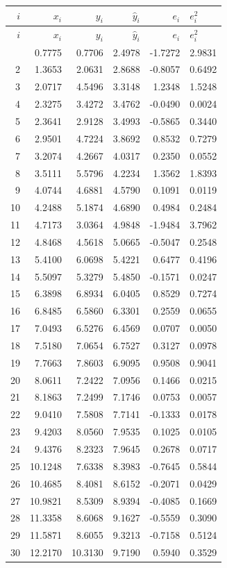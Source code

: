 \documentclass[12pt,a4paper]{article}
\begin{document}
\begin{longtable}{rrrrr}
\toprule
$i$ & $x_i$ & $y_i$ & $\hat{y}_i$ & $e_i$ & $e_i^2$ \\
\midrule
\endfirsthead
\toprule
$i$ & $x_i$ & $y_i$ & $\hat{y}_i$ & $e_i$ & $e_i^2$ \\
\midrule
\endhead
\bottomrule
{} & 0.7775 &  0.7706 &  2.4978 & -1.7272 & 2.9831 \\
  2 & 1.3653 &  2.0631 &  2.8688 & -0.8057 & 0.6492 \\
  3 & 2.0717 &  4.5496 &  3.3148 &  1.2348 & 1.5248 \\
  4 & 2.3275 &  3.4272 &  3.4762 & -0.0490 & 0.0024 \\
  5 & 2.3641 &  2.9128 &  3.4993 & -0.5865 & 0.3440 \\
  6 & 2.9501 &  4.7224 &  3.8692 &  0.8532 & 0.7279 \\
  7 & 3.2074 &  4.2667 &  4.0317 &  0.2350 & 0.0552 \\
  8 & 3.5111 &  5.5796 &  4.2234 &  1.3562 & 1.8393 \\
  9 & 4.0744 &  4.6881 &  4.5790 &  0.1091 & 0.0119 \\
 10 & 4.2488 &  5.1874 &  4.6890 &  0.4984 & 0.2484 \\
 11 & 4.7173 &  3.0364 &  4.9848 & -1.9484 & 3.7962 \\
 12 & 4.8468 &  4.5618 &  5.0665 & -0.5047 & 0.2548 \\
 13 & 5.4100 &  6.0698 &  5.4221 &  0.6477 & 0.4196 \\
 14 & 5.5097 &  5.3279 &  5.4850 & -0.1571 & 0.0247 \\
 15 & 6.3898 &  6.8934 &  6.0405 &  0.8529 & 0.7274 \\
 16 & 6.8485 &  6.5860 &  6.3301 &  0.2559 & 0.0655 \\
 17 & 7.0493 &  6.5276 &  6.4569 &  0.0707 & 0.0050 \\
 18 & 7.5180 &  7.0654 &  6.7527 &  0.3127 & 0.0978 \\
 19 & 7.7663 &  7.8603 &  6.9095 &  0.9508 & 0.9041 \\
 20 & 8.0611 &  7.2422 &  7.0956 &  0.1466 & 0.0215 \\
 21 & 8.1863 &  7.2499 &  7.1746 &  0.0753 & 0.0057 \\
 22 & 9.0410 &  7.5808 &  7.7141 & -0.1333 & 0.0178 \\
 23 & 9.4203 &  8.0560 &  7.9535 &  0.1025 & 0.0105 \\
 24 & 9.4376 &  8.2323 &  7.9645 &  0.2678 & 0.0717 \\
 25 & 10.1248 &  7.6338 &  8.3983 & -0.7645 & 0.5844 \\
 26 & 10.4685 &  8.4081 &  8.6152 & -0.2071 & 0.0429 \\
 27 & 10.9821 &  8.5309 &  8.9394 & -0.4085 & 0.1669 \\
 28 & 11.3358 &  8.6068 &  9.1627 & -0.5559 & 0.3090 \\
 29 & 11.5871 &  8.6055 &  9.3213 & -0.7158 & 0.5124 \\
 30 & 12.2170 & 10.3130 &  9.7190 &  0.5940 & 0.3529 \\
\end{longtable}
\end{document}
